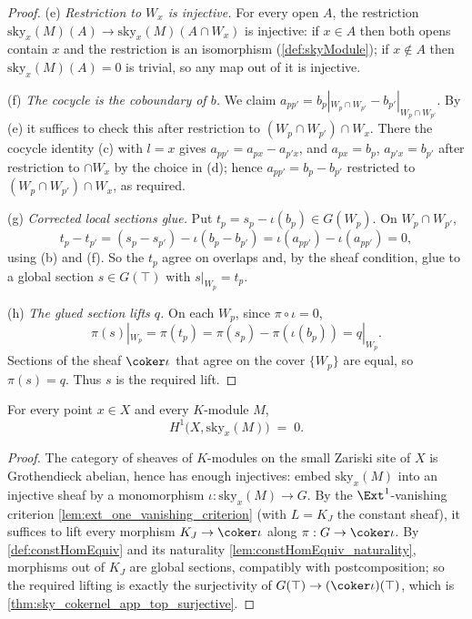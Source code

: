 \begin{proof}
  (e) \emph{Restriction to \(W_x\) is injective.} For every open \(A\), the restriction
  \(\mathrm{sky}_x(M)(A) \to \mathrm{sky}_x(M)(A \cap W_x)\) is injective: if \(x \in A\) then
  both opens contain \(x\) and the restriction is an isomorphism (\ref{def:skyModule}); if
  \(x \notin A\) then \(\mathrm{sky}_x(M)(A) = 0\) is trivial, so any map out of it is injective.

  (f) \emph{The cocycle is the coboundary of \(b\).} We claim
  \(a_{pp'} = b_p|_{W_p \cap W_{p'}} - b_{p'}|_{W_p \cap W_{p'}}\). By (e) it suffices to check
  this after restriction to \((W_p \cap W_{p'}) \cap W_x\). There the cocycle identity (c) with
  \(l = x\) gives \(a_{pp'} = a_{px} - a_{p'x}\), and \(a_{px} = b_p\), \(a_{p'x} = b_{p'}\)
  after restriction to \(\cap W_x\) by the choice in (d); hence
  \(a_{pp'} = b_p - b_{p'}\) restricted to \((W_p \cap W_{p'}) \cap W_x\), as required.

  (g) \emph{Corrected local sections glue.} Put \(t_p = s_p - \iota(b_p) \in G(W_p)\). On
  \(W_p \cap W_{p'}\),
  \[
    t_p - t_{p'} = (s_p - s_{p'}) - \iota(b_p - b_{p'}) = \iota(a_{pp'}) - \iota(a_{pp'}) = 0 ,
  \]
  using (b) and (f). So the \(t_p\) agree on overlaps and, by the sheaf condition, glue to a
  global section \(s \in G(\top)\) with \(s|_{W_p} = t_p\).

  (h) \emph{The glued section lifts \(q\).} On each \(W_p\), since \(\pi \circ \iota = 0\),
  \[
    \pi(s)|_{W_p} = \pi(t_p) = \pi(s_p) - \pi(\iota(b_p)) = q|_{W_p} .
  \]
  Sections of the sheaf \(\coker \iota\) that agree on the cover \(\{W_p\}\) are equal, so
  \(\pi(s) = q\). Thus \(s\) is the required lift.
\end{proof}

\begin{theorem}
  \label{thm:skyModule_h1_vanishing}
  \leanok
  For every point \(x \in X\) and every \(K\)-module \(M\),
  \[
    H^1\bigl(X, \mathrm{sky}_x(M)\bigr) \;=\; 0 .
  \]
\end{theorem}
\begin{proof}
  \leanok
  The category of sheaves of \(K\)-modules on the small Zariski site of \(X\) is Grothendieck
  abelian, hence has enough injectives: embed \(\mathrm{sky}_x(M)\) into an injective sheaf by a
  monomorphism \(\iota : \mathrm{sky}_x(M) \to G\). By the \(\Ext^1\)-vanishing criterion
  \ref{lem:ext_one_vanishing_criterion} (with \(L = K_J\) the constant sheaf), it suffices to
  lift every morphism \(K_J \to \coker \iota\) along \(\pi : G \to \coker \iota\). By
  \ref{def:constHomEquiv} and its naturality \ref{lem:constHomEquiv_naturality}, morphisms out
  of \(K_J\) are global sections, compatibly with postcomposition; so the required lifting is
  exactly the surjectivity of \(G(\top) \to (\coker \iota)(\top)\), which is
  \ref{thm:sky_cokernel_app_top_surjective}.
\end{proof}

